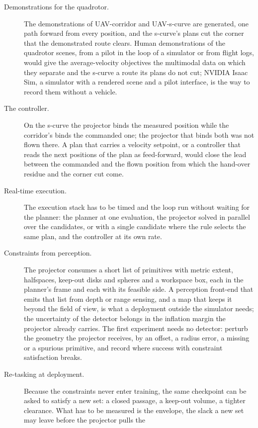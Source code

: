 \begin{description}
  \item[Demonstrations for the quadrotor.] The demonstrations of UAV-corridor and UAV-s-curve are
    generated, one path forward from every position, and the s-curve's plans cut the corner that the
    demonstrated route clears. Human demonstrations of the quadrotor scenes, from a pilot in the loop
    of a simulator or from flight logs, would give the average-velocity objectives the multimodal data
    on which they separate and the s-curve a route its plans do not cut; NVIDIA Isaac Sim, a simulator
    with a rendered scene and a pilot interface, is the way to record them without a vehicle.
  \item[The controller.] On the s-curve the projector binds the measured position while the
    corridor's binds the commanded one; the projector that binds both was not flown there. A plan that
    carries a velocity setpoint, or a controller that reads the next positions of the plan as
    feed-forward, would close the lead between the commanded and the flown position from which the
    hand-over residue and the corner cut come.
  \item[Real-time execution.] The execution stack has to be timed and the loop run without waiting for
    the planner: the planner at one evaluation, the projector solved in parallel over the candidates,
    or with a single candidate where the rule selects the same plan, and the controller at its own rate.
  \item[Constraints from perception.] The projector consumes a short list of primitives with metric
    extent, halfspaces, keep-out disks and spheres and a workspace box, each in the planner's frame and
    each with its feasible side. A perception front-end that emits that list from depth or range
    sensing, and a map that keeps it beyond the field of view, is what a deployment outside the
    simulator needs; the uncertainty of the detector belongs in the inflation margin the projector
    already carries. The first experiment needs no detector: perturb the geometry the projector
    receives, by an offset, a radius error, a missing or a spurious primitive, and record where success
    with constraint satisfaction breaks.
  \item[Re-tasking at deployment.] Because the constraints never enter training, the same checkpoint
    can be asked to satisfy a new set: a closed passage, a keep-out volume, a tighter clearance. What
    has to be measured is the envelope, the slack a new set may leave before the projector pulls the

\end{description}

